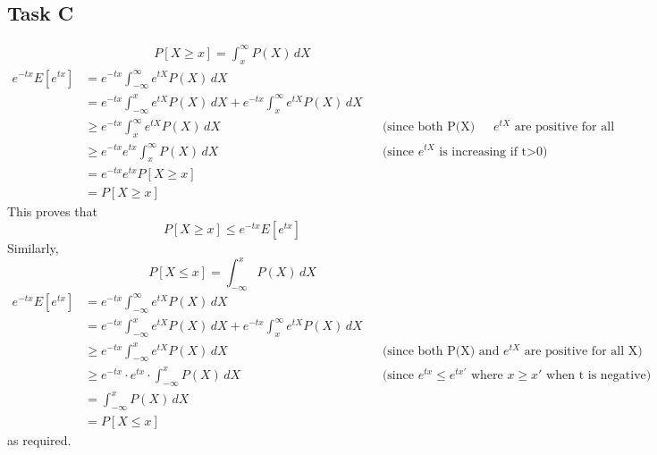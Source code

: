\subsection{Task C}
\begin{align*}
    P[X\ge x] = \int_{x}^{\infty} P(X) \, dX
\end{align*}
\begin{align*}
    e^{-tx}E[e^{tx}] & = e^{-tx} \int_{-\infty}^{\infty} e^{tX} P(X) \, dX && \\
    & = e^{-tx}\int_{-\infty}^x e^{tX} P(X) \, dX + e^{-tx}\int_{x}^{\infty} e^{tX} P(X) \, dX && \\
    & \ge e^{-tx} \int_{x}^{\infty} e^{tX} P(X) \, dX && \text{(since both P(X) and $e^{tX}$ are positive for all X)}\\
    & \ge e^{-tx}  e^{tx} \int_{x}^{\infty} P(X) \, dX &&\text{(since $e^{tX}$ is increasing if t>0)}\\
    & = e^{-tx} e^{tx} P[X \ge x] && \\
    & = P[X \ge x] &&
\end{align*}
This proves that 
\begin{equation}
    \label{eq:1}
    P[X\ge x] \le e^{-tx}E[e^{tx}]
\end{equation}
Similarly, 
\[
    P[X\le x] = \int_{-\infty}^{x} P(X) \, dX
\]
\begin{align*}
    e^{-tx}E[e^{tx}] & = e^{-tx} \int_{-\infty}^{\infty} e^{tX} P(X) \, dX && \\
    & = e^{-tx}\int_{-\infty}^x e^{tX} P(X) \, dX + e^{-tx}\int_{x}^{\infty} e^{tX} P(X) \, dX && \\
    & \ge e^{-tx} \int_{-\infty}^{x} e^{tX} P(X) \, dX && \text{(since both P(X) and $e^{tX}$ are positive for all X)}\\
    & \ge e^{-tx}\cdot e^{tx} \cdot \int_{-\infty}^{x}P(X)\, dX && \text{(since $e^{tx} \le e^{tx'}$ where $x \ge x'$ when t is negative)}\\
    & = \int_{-\infty}^{x} P(X) \, dX && \\
    & = P[X \le x] &&
    \label{eq:1}
\end{align*}
as required.
